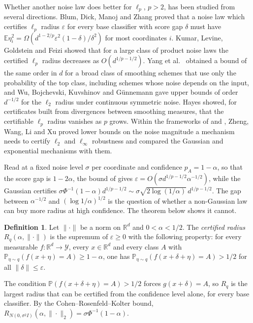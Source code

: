 \documentclass[11pt]{amsart}
\theoremstyle{definition}
\newtheorem{definition}[theorem]{Definition}
\theoremstyle{remark}
\newcommand{\E}{\mathbb{E}}
\newcommand{\PP}{\mathbb{P}}
\newcommand{\R}{\mathbb{R}}
\newcommand{\Rad}{R}
\begin{document}
Whether another noise law does better for $\ell_p$, $p>2$, has been studied from several directions. Blum,
Dick, Manoj and Zhang \cite{BDMZ20} proved that a noise law which certifies $\ell_p$ radius $\varepsilon$ for
every base classifier with score gap $\delta$ must have $\E\eta_i^2=\Omega(d^{1-2/p}\varepsilon^2
(1-\delta)/\delta^2)$ for most coordinates $i$. Kumar, Levine, Goldstein and Feizi \cite{KLGF20} showed that
for a large class of product noise laws the certified $\ell_p$ radius decreases as $O(d^{1/p-1/2})$. Yang et
al.\ \cite{YDHSRL20} obtained a bound of the same order in $d$ for a broad class of smoothing schemes that use
only the probability of the top class, including schemes whose noise depends on the input, and Wu,
Bojchevski, Kuvshinov and G\"unnemann \cite{WBKG21} gave upper bounds of order $d^{-1/2}$ for the $\ell_2$
radius under continuous symmetric noise. Hayes \cite{Hay20} showed, for certificates built from divergences
between smoothing measures, that the certifiable $\ell_p$ radius vanishes as $p$ grows. Within the frameworks
of \cite{LAG19} and \cite{LCWC19}, Zheng, Wang, Li and Xu \cite{ZWLX20} proved lower bounds on the noise
magnitude a mechanism needs to certify $\ell_2$ and $\ell_\infty$ robustness and compared the Gaussian and
exponential mechanisms with them.

Read at a fixed noise level $\sigma$ per coordinate and confidence $p_A=1-\alpha$, so that the score gap is
$1-2\alpha$, the bound of \cite{BDMZ20} gives $\varepsilon=O(\sigma d^{1/p-1/2}\alpha^{-1/2})$, while the
Gaussian certifies $\sigma\Phi^{-1}(1-\alpha)d^{1/p-1/2}\sim\sigma\sqrt{2\log(1/\alpha)}\,d^{1/p-1/2}$. The
gap between $\alpha^{-1/2}$ and $(\log1/\alpha)^{1/2}$ is the question of whether a non-Gaussian law can buy
more radius at high confidence. The theorem below shows it cannot.

\begin{definition}\label{def:radius}
Let $\|\cdot\|$ be a norm on $\R^d$ and $0<\alpha<1/2$. The \emph{certified radius} $\Rad_q(\alpha,\|\cdot\|)$
is the supremum of $\varepsilon\ge0$ with the following property: for every measurable
$f\colon\R^d\to\mathcal{Y}$, every $x\in\R^d$ and every class $A$ with $\PP_{\eta\sim q}(f(x+\eta)=A)\ge1-\alpha$,
one has $\PP_{\eta\sim q}(f(x+\delta+\eta)=A)>1/2$ for all $\|\delta\|\le\varepsilon$.
\end{definition}

The condition $\PP(f(x+\delta+\eta)=A)>1/2$ forces $g(x+\delta)=A$, so $\Rad_q$ is the largest radius that can
be certified from the confidence level alone, for every base classifier. By the Cohen--Rosenfeld--Kolter bound,
$\Rad_{N(0,\sigma^2I)}(\alpha,\|\cdot\|_2)=\sigma\Phi^{-1}(1-\alpha)$.
\end{document}
